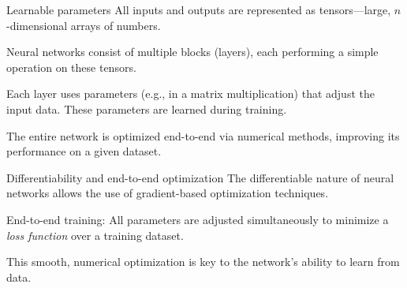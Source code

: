 \documentclass[xcolor=x11names,compress,10pt,unknownkeysallowed,aspectratio=169]{beamer}
\begin{document}
\begin{frame}{Learnable parameters}
All inputs and outputs are represented as \alert{tensors}---large, $n$-dimensional arrays of numbers.

\vspace{0.6cm}
Neural networks consist of multiple blocks (\alert{layers}), each performing a simple operation on these tensors.

\vspace{0.6cm}
Each layer uses \alert{parameters} (e.g., in a matrix multiplication) that adjust the input data. These parameters are \alert{learned} during training.

\vspace{0.6cm}
The entire network is \alert{optimized} end-to-end via numerical methods, improving its \linebreak performance on a given \alert{dataset}.
\end{frame}
%
\begin{frame}{Differentiability and end-to-end optimization}
The differentiable nature of neural networks allows the use of \alert{gradient-based optimization techniques}.

\vspace{0.8cm}
\alert{End-to-end training:} All parameters are adjusted simultaneously to minimize a \textit{loss function} over a training dataset.

\vspace{0.8cm}
This smooth, numerical optimization is key to the network’s ability to \alert{learn from data}.
  
\end{frame}
%
\end{document}
